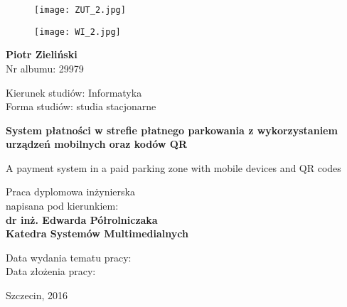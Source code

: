 \begin{titlepage}
	\begin{figure}[!htb]
		\begin{minipage}{0.48\textwidth}
			\raggedright
			\texttt{[image: ZUT\_2.jpg]}
		\end{minipage}\hfill
		\begin{minipage}{0.48\textwidth}
			\raggedleft
			\texttt{[image: WI\_2.jpg]}
		\end{minipage}
	\end{figure}
	\vspace{3cm}
	\begin{center}
		\textbf{Piotr Zieliński}\\
		Nr albumu: 29979
	\end{center}
	\begin{center}
		Kierunek studiów: Informatyka\\
		Forma studiów: studia stacjonarne
	\end{center}
	\vspace{1.5cm}
	\begin{center}
		\textbf{\LARGE System płatności w strefie płatnego parkowania z wykorzystaniem urządzeń mobilnych oraz kodów QR}
	\end{center}
	\begin{center}
		{\large A payment system in a paid parking zone with mobile devices and QR codes}
	\end{center}
	\begin{center}
		Praca dyplomowa inżynierska\\
		napisana pod kierunkiem:\\
		\textbf{dr inż. Edwarda Półrolniczaka\\
			Katedra Systemów Multimedialnych}
	\end{center}
	\vspace{.5cm}
	Data wydania tematu pracy:\\
	Data złożenia pracy:
	
	\begin{center}
		Szczecin, 2016
	\end{center}

\end{titlepage}